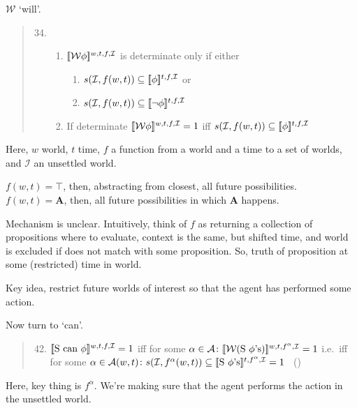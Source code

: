 \begin{note}
  \(\mathcal{W}\) `will'.

  \begin{quote}
    \begin{enumerate}
      \setcounter{enumi}{33}
    \item
      \begin{enumerate}
      \item
        \(\sem[w,t,f,\mathcal{I}]{\mathcal{W}\phi}\) is determinate only if either
        \begin{enumerate}
        \item
          \(s(\mathcal{I}, f(w,t)) \subseteq \sem[t,f,\mathcal{I}]{\phi}\) or
        \item
          \(s(\mathcal{I}, f(w,t)) \subseteq \sem[t,f,\mathcal{I}]{\lnot\phi}\)
        \end{enumerate}
      \item
        If determinate \(\sem[w,t,f,\mathcal{I}]{\mathcal{W}\phi} = 1\) iff \(s(\mathcal{I}, f(w,t)) \subseteq \sem[t,f,\mathcal{I}]{\phi}\)
      \end{enumerate}
    \end{enumerate}
  \end{quote}

  Here, \(w\) world, \(t\) time, \(f\) a function from a world and a time to a set of worlds, and \(\mathcal{I}\) an unsettled world.

  \(f(w,t) = \top\), then, abstracting from closest, all future possibilities.
  \(f(w,t) = \mathbf{A}\), then, all future possibilities in which \(\mathbf{A}\) happens.

  Mechanism is unclear.
  Intuitively, think of \(f\) as returning a collection of propositions where to evaluate, context is the same, but shifted time, and world is excluded if does not match with some proposition.
  So, truth of proposition at some (restricted) time in world.

  Key idea, restrict future worlds of interest so that the agent has performed some action.

  Now turn to `can'.

  \begin{quote}
    \begin{enumerate}
      \setcounter{enumi}{41}
    \item
      \(\sem[w,t,f,\mathcal{I}]{\text{S can }\phi} = 1\) iff for some \(\alpha \in \mathcal{A}\colon \sem[w,t,f^{\alpha},\mathcal{I}]{\mathcal{W}(\text{S }\phi\text{'s})} = 1\)\newline
      i.e.\ iff for some \(\alpha \in \mathcal{A}(w,t)\colon s(\mathcal{I}, f^{\alpha}(w,t)) \subseteq \sem[t,f^{\alpha},\mathcal{I}]{\text{S }\phi\text{'s}} = 1\)\newline
      \mbox{ }\hfill\mbox{(\citeyear[16]{Boylan:2020aa})}
    \end{enumerate}
  \end{quote}
  Here, key thing is \(f^{\alpha}\).
  We're making sure that the agent performs the action in the unsettled world.


\end{note}
